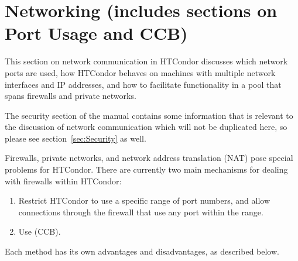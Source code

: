 \section{Networking (includes sections on Port Usage and CCB)}\label{sec:Networking}

This section on
network communication in HTCondor
discusses which network ports are used,
how HTCondor behaves on machines with multiple network interfaces
and IP addresses,
and how to facilitate functionality in a pool that spans
firewalls and private networks.

The security section of the manual contains some
information that is relevant to the discussion of network
communication which will not be duplicated here, so please
see section~\ref{sec:Security} as well.

Firewalls, private networks, and network address translation (NAT)
pose special problems for HTCondor.
There are currently two main mechanisms for dealing with firewalls
within HTCondor:

\begin{enumerate}

\item Restrict HTCondor to use a specific range of port numbers, and
  allow connections through the firewall that use any port within the
  range.

\item Use  (CCB).

\end{enumerate}

Each method has its own advantages and disadvantages,
as described below.












